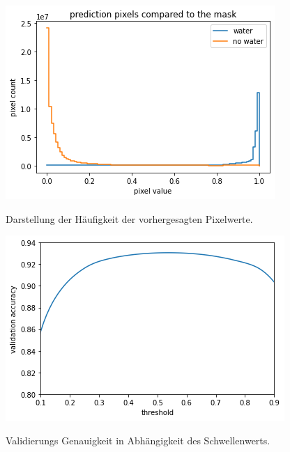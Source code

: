 \begin{figure}[ht]
    \centering
    \begin{minipage}[t]{0.464\linewidth}
        \centering
        \includegraphics[width=\textwidth]{content/img/pixel_values_counter.png}
        \caption{ }{\small{Darstellung der Häufigkeit der vorhergesagten Pixelwerte.}}
        \label{fig:count_values}
    \end{minipage}%
    \begin{minipage}[t]{0.48\linewidth}
        \centering
        \includegraphics[width=\textwidth]{content/img/schwellenwert.png}
        \caption{ }{\small{Validierungs Genauigkeit in Abhängigkeit des Schwellenwerts.}}
        \label{fig:schwellenwert}
    \end{minipage}
\end{figure}

